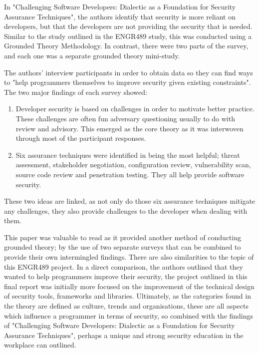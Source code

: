 In "Challenging Software Developers: Dialectic as a Foundation for Security Assurance Techniques"\cite{charles}, the authors identify that security is more reliant on developers, but that the developers are not providing the security that is needed. Similar to the study outlined in the ENGR489 study, this was conducted using a Grounded Theory Methodology. In contrast, there were two parts of the survey, and each one was a separate grounded theory mini-study. 
\newline
\par The authors' interview participants in order to obtain data so they can find ways to "help programmers themselves to improve security given existing constraints".  
\newline
\newline
The two major findings of each survey showed:

\begin{enumerate}
\item Developer security is based on challenges in order to motivate better practice. These challenges are often fun adversary questioning usually to do with review and advisory.  This emerged as the core theory as it was interwoven through most of the participant responses.
\item Six assurance techniques were identified in being the most helpful; threat assessment, stakeholder negotiation, configuration review, vulnerability scan, source code review and penetration testing. They all help provide software security. 
\end{enumerate}

\par These two ideas are linked, as not only do those six assurance techniques mitigate any challenges, they also provide challenges to the developer when dealing with them. 
\newline
\par This paper was valuable to read as it provided another method of conducting grounded theory; by the use of two separate surveys that can be combined to provide their own intermingled findings. There are also similarities to the topic of this ENGR489 project. In a direct comparison, the authors outlined that they wanted to help programmers improve their security, the project outlined in this final report was initially more focused on the improvement of the technical design of security tools, frameworks and libraries. Ultimately, as the categories found in the theory are defined as culture, trends and organisations, these are all aspects which influence a programmer in terms of security, so combined with the findings of "Challenging Software Developers: Dialectic as a Foundation for Security Assurance Techniques", perhaps a unique and strong security education in the workplace can outlined. 
\newline
\par


